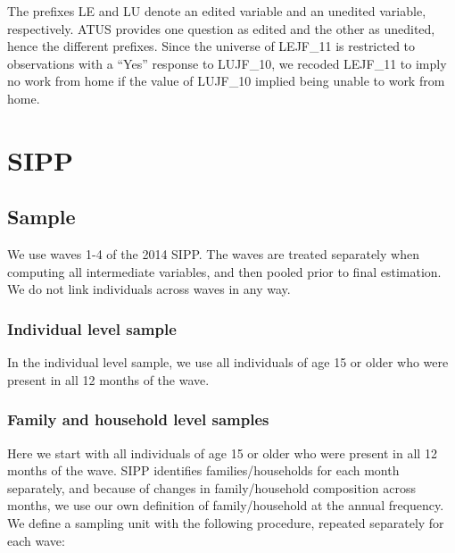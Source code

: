 \documentclass{article}
\begin{document}
The prefixes LE and LU denote an edited variable and an unedited variable, respectively. ATUS provides one question as edited and the other as unedited, hence the different prefixes. Since the universe of LEJF\_11 is restricted to observations with a ``Yes'' response to LUJF\_10, we recoded LEJF\_11 to imply no work from home if the value of LUJF\_10 implied being unable to work from home.

\section{SIPP}
\subsection{Sample}
We use waves 1-4 of the 2014 SIPP. The waves are treated separately when computing all intermediate variables, and then pooled prior to final estimation. We do not link individuals across waves in any way.

\subsubsection{Individual level sample}
In the individual level sample, we use all individuals of age 15 or older who were present in all 12 months of the wave.

\subsubsection{Family and household level samples}
Here we start with all individuals of age 15 or older who were present in all 12 months of the wave. SIPP identifies families/households for each month separately, and because of changes in family/household composition across months, we use our own definition of family/household at the annual frequency. We define a sampling unit with the following procedure, repeated separately for each wave:
\end{document}
